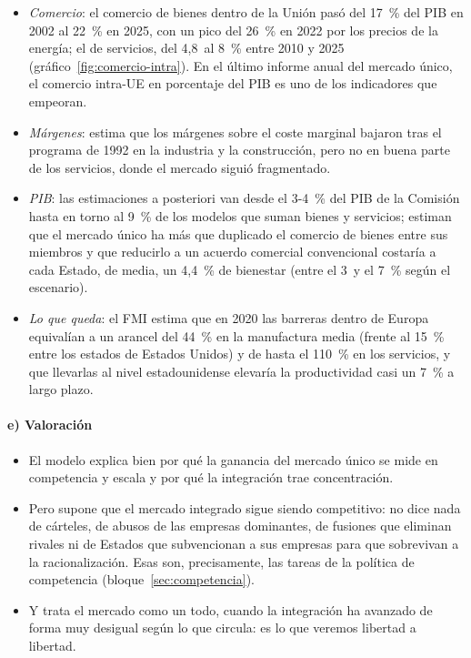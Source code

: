 \documentclass[11pt]{article}
\begin{document}
\begin{itemize}
\item \emph{Comercio}: el comercio de bienes dentro de la Unión pasó del 17~\% del PIB en 2002 al 22~\% en 2025, con un pico del 26~\% en 2022 por los precios de la energía; el de servicios, del 4,8~al 8~\% entre 2010 y 2025 (gráfico~\ref{fig:comercio-intra}). En el último informe anual del mercado único, el comercio intra-UE en porcentaje del PIB es uno de los indicadores que empeoran\nocite{CE2026InformeAnual}.
\item \emph{Márgenes}: \textcite{Badinger2007Has} estima que los márgenes sobre el coste marginal bajaron tras el programa de 1992 en la industria y la construcción, pero no en buena parte de los servicios, donde el mercado siguió fragmentado.
\item \emph{PIB}: las estimaciones a posteriori van desde el 3-4~\% del PIB de la Comisión\nocite{CE2025EstrategiaFicha} hasta en torno al 9~\% de los modelos que suman bienes y servicios\nocite{inTVeld2019Economic}; \textcite{MayerVicardZignago2019Cost} estiman que el mercado único ha más que duplicado el comercio de bienes entre sus miembros y que reducirlo a un acuerdo comercial convencional costaría a cada Estado, de media, un 4,4~\% de bienestar (entre el 3~y el 7~\% según el escenario).
\item \emph{Lo que queda}: el FMI estima que en 2020 las barreras dentro de Europa equivalían a un arancel del 44~\% en la manufactura media (frente al 15~\% entre los estados de Estados Unidos) y de hasta el 110~\% en los servicios, y que llevarlas al nivel estadounidense elevaría la productividad casi un 7~\% a largo plazo\nocite{FMI2024REO,FMI2024Kammer}.
\end{itemize}


\paragraph{e) Valoración}

\begin{itemize}
\item El modelo explica bien por qué la ganancia del mercado único se mide en competencia y escala y por qué la integración trae concentración.
\item Pero supone que el mercado integrado sigue siendo competitivo: no dice nada de cárteles, de abusos de las empresas dominantes, de fusiones que eliminan rivales ni de Estados que subvencionan a sus empresas para que sobrevivan a la racionalización. Esas son, precisamente, las tareas de la política de competencia (bloque~\ref{sec:competencia}).
\item Y trata el mercado como un todo, cuando la integración ha avanzado de forma muy desigual según lo que circula: es lo que veremos libertad a libertad.
\end{itemize}
\end{document}
